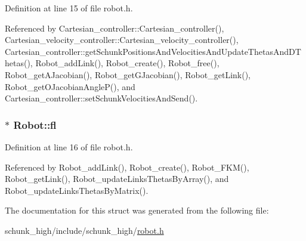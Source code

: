 Definition at line 15 of file robot.\-h.



Referenced by Cartesian\-\_\-controller\-::\-Cartesian\-\_\-controller(), Cartesian\-\_\-velocity\-\_\-controller\-::\-Cartesian\-\_\-velocity\-\_\-controller(), Cartesian\-\_\-controller\-::get\-Schunk\-Positions\-And\-Velocities\-And\-Update\-Thetas\-And\-D\-Thetas(), Robot\-\_\-add\-Link(), Robot\-\_\-create(), Robot\-\_\-free(), Robot\-\_\-get\-A\-Jacobian(), Robot\-\_\-get\-G\-Jacobian(), Robot\-\_\-get\-Link(), Robot\-\_\-get\-O\-Jacobian\-Angle\-P(), and Cartesian\-\_\-controller\-::set\-Schunk\-Velocities\-And\-Send().

\hypertarget{structRobot_aa983a42f95f55c494fd4154c4d42be47}{
\subsubsection[{fl}]{$\ast$ Robot\-::fl}}\label{structRobot_aa983a42f95f55c494fd4154c4d42be47}


Definition at line 16 of file robot.\-h.



Referenced by Robot\-\_\-add\-Link(), Robot\-\_\-create(), Robot\-\_\-\-F\-K\-M(), Robot\-\_\-get\-Link(), Robot\-\_\-update\-Links\-Thetas\-By\-Array(), and Robot\-\_\-update\-Links\-Thetas\-By\-Matrix().



The documentation for this struct was generated from the following file\-:\begin{DoxyCompactItemize}
\item 
schunk\-\_\-high/include/schunk\-\_\-high/\hyperlink{robot_8h}{robot.\-h}\end{DoxyCompactItemize}
